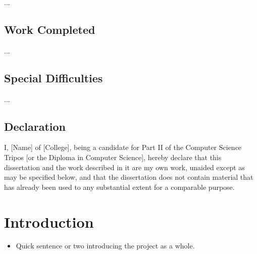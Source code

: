 \documentclass[12pt,twoside,notitlepage]{report}
\begin{document}
...


\section*{Work Completed}

... 

\section*{Special Difficulties}

... 

 
\newpage
\section*{Declaration}

I, [Name] of [College], being a candidate for Part II of the Computer
Science Tripos [or the Diploma in Computer Science], hereby declare
that this dissertation and the work described in it are my own work,
unaided except as may be specified below, and that the dissertation
does not contain material that has already been used to any substantial
extent for a comparable purpose.

\bigskip
{}

\medskip
{}

\cleardoublepage

\tableofcontents

\listoffigures



\cleardoublepage        %

\setcounter{page}{1}
\pagestyle{headings}


\chapter{Introduction}

\begin{itemize}
  \item Quick sentence or two introducing the project as a whole.
\end{itemize}
\end{document}

